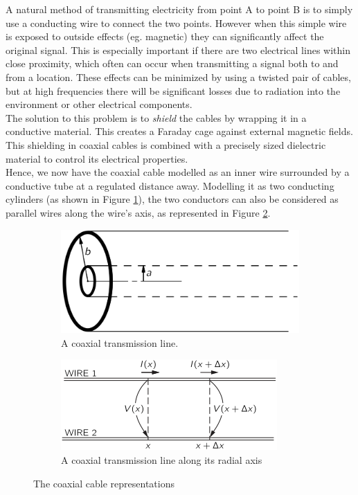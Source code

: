 A natural method of transmitting electricity from point A to point B is to simply use a conducting wire to connect the two points. However when this simple wire is exposed to outside effects (eg. magnetic) they can significantly affect the original signal. This is especially important if there are two electrical lines within close proximity, which often can occur when transmitting a signal both to and from a location. These effects can be minimized by using a twisted pair of cables, but at high frequencies there will be significant losses due to radiation into the environment or other electrical components. \cite{feynman}\\

The solution to this problem is to \textit{shield} the cables by wrapping it in a conductive material. This creates a Faraday cage against external magnetic fields. This shielding in coaxial cables is combined with a precisely sized dielectric material to control its electrical properties.\\

Hence, we now have the coaxial cable modelled as an inner wire surrounded by a conductive tube at a regulated distance away. Modelling it as two conducting cylinders (as shown in Figure \ref{fig:coax_theory_1}), the two conductors can also be considered as parallel wires along the wire's axis, as represented in Figure \ref{fig:coax_theory_2}. 

\begin{figure}[h]
\centering
\begin{subfigure}{.5\textwidth}
  \centering
  \includegraphics[width=.666\linewidth]{figures/coaxial_derivation_1.png}
  \caption{A coaxial transmission line. \cite{feynman}}
  \label{fig:coax_theory_1}
\end{subfigure}%
\begin{subfigure}{.5\textwidth}
  \centering
  \includegraphics[width=.75\linewidth]{figures/coaxial_derivation_2.png}
  \caption{A coaxial transmission line along its radial axis \cite{feynman}}
  \label{fig:coax_theory_2}
\end{subfigure}
\caption{The coaxial cable representations}
\label{fig:test}
\end{figure}

